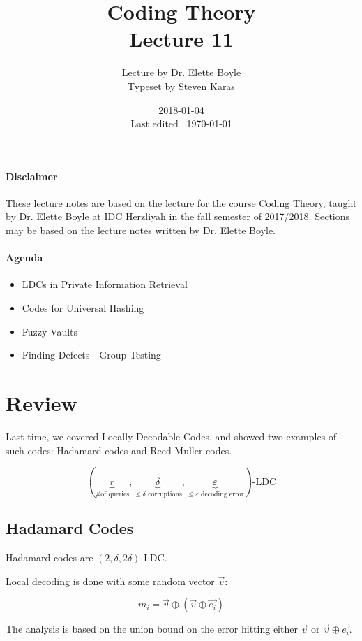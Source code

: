 \documentclass{idc_msc}
\title{Coding Theory\\\large Lecture 11}
\date{2018-01-04 \\ Last edited \currenttime\ \today}
\author{Lecture by Dr. Elette Boyle\\Typeset by Steven Karas}
\begin{document}
\maketitle

\paragraph{Disclaimer}

These lecture notes are based on the lecture for the course Coding Theory, taught by Dr. Elette Boyle at IDC Herzliyah in the fall semester of 2017/2018.
Sections may be based on the lecture notes written by Dr. Elette Boyle.

\paragraph{Agenda}

\begin{itemize}
  \item LDCs in Private Information Retrieval
  \item Codes for Universal Hashing
  \item Fuzzy Vaults
  \item Finding Defects - Group Testing
\end{itemize}

\section{Review}

Last time, we covered Locally Decodable Codes, and showed two examples of such codes: Hadamard codes and Reed-Muller codes.

\[(\underbrace{r}_{\text{\# of queries}},\underbrace{\delta}_{\text{\(\le \delta\) corruptions}},\underbrace{\varepsilon}_{\text{\(\le \varepsilon\) decoding error}})\text{-LDC}\]

\subsection{Hadamard Codes}

Hadamard codes are \((2, \delta, 2\delta)\)-LDC.

Local decoding is done with some random vector \(\vec{v}\):

\[m_i = \vec{v} \oplus (\vec{v} \oplus \vec{e_i})\]

The analysis is based on the union bound on the error hitting either \(\vec{v}\) or \(\vec{v} \oplus \vec{e_i}\).
\end{document}
